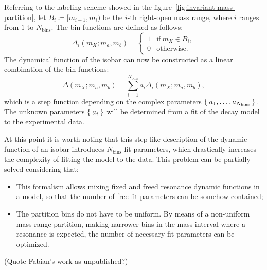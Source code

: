 Referring to the labeling scheme showed in the figure~\ref{fig:invariant-mass-partition}, let $B_i \coloneqq [m_{i-1}, m_i)$ be the $i$-th right-open mass range, where $i$ ranges from $1$ to $N_\text{bins}$.
The bin functions are defined as follows:
\begin{equation}
    \Delta_i(m_X; m_a, m_b) =
    \begin{cases}
        1 &\text{if}\ m_X \in B_i, \\
        0 &\text{otherwise}.
    \end{cases}
\end{equation}
The dynamical function of the isobar can now be constructed as a linear combination of the bin functions:
\begin{equation}
    \Delta(m_X; m_a, m_b) = \sum_{i=1}^{N_\text{bins}} a_i \Delta_i(m_X;m_a, m_b),
\end{equation}
which is a step function depending on the complex parameters $\Set{a_1, \dots, a_{N_\text{bins}}}$.
The unknown parameters $\Set{ a_i }$ will be determined from a fit of the decay model to the experimental data.


At this point it is worth noting that this step-like description of the dynamic function of an isobar introduces $N_\text{bins}$ fit parameters, which drastically increases the complexity of fitting the model to the data.
This problem can be partially solved considering that:
\begin{itemize}
    \item 
        This formalism allows mixing fixed and freed resonance dynamic functions in a model, so that the number of free fit parameters can be somehow contained;
    \item
        The partition bins do not have to be uniform. By means of a non-uniform mass-range partition, making narrower bins in the mass interval where a resonance is expected, the number of necessary fit parameters can be optimized.
\end{itemize}

{\color{red}
(Quote Fabian's work as unpublished?)
}
